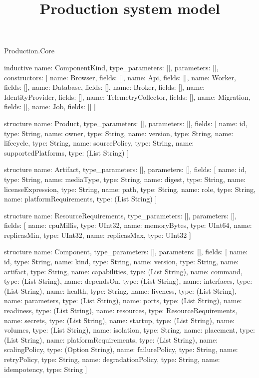 \begin{lexlean}{Production.Core}
\title{Production system model}
\begin{semanticmodule}
inductive{
  name: ComponentKind,
  type_parameters: [],
  parameters: [],
  constructors: [
    {name: Browser, fields: []},
    {name: Api, fields: []},
    {name: Worker, fields: []},
    {name: Database, fields: []},
    {name: Broker, fields: []},
    {name: IdentityProvider, fields: []},
    {name: TelemetryCollector, fields: []},
    {name: Migration, fields: []},
    {name: Job, fields: []}
  ]
}

structure{
  name: Product,
  type_parameters: [],
  parameters: [],
  fields: [
    {name: id, type: String},
    {name: owner, type: String},
    {name: version, type: String},
    {name: lifecycle, type: String},
    {name: sourcePolicy, type: String},
    {name: supportedPlatforms, type: (List String)}
  ]
}

structure{
  name: Artifact,
  type_parameters: [],
  parameters: [],
  fields: [
    {name: id, type: String},
    {name: mediaType, type: String},
    {name: digest, type: String},
    {name: licenseExpression, type: String},
    {name: path, type: String},
    {name: role, type: String},
    {name: platformRequirements, type: (List String)}
  ]
}

structure{
  name: ResourceRequirements,
  type_parameters: [],
  parameters: [],
  fields: [
    {name: cpuMillis, type: UInt32},
    {name: memoryBytes, type: UInt64},
    {name: replicasMin, type: UInt32},
    {name: replicasMax, type: UInt32}
  ]
}

structure{
  name: Component,
  type_parameters: [],
  parameters: [],
  fields: [
    {name: id, type: String},
    {name: kind, type: String},
    {name: version, type: String},
    {name: artifact, type: String},
    {name: capabilities, type: (List String)},
    {name: command, type: (List String)},
    {name: dependsOn, type: (List String)},
    {name: interfaces, type: (List String)},
    {name: health, type: String},
    {name: liveness, type: (List String)},
    {name: parameters, type: (List String)},
    {name: ports, type: (List String)},
    {name: readiness, type: (List String)},
    {name: resources, type: ResourceRequirements},
    {name: secrets, type: (List String)},
    {name: startup, type: (List String)},
    {name: volumes, type: (List String)},
    {name: isolation, type: String},
    {name: placement, type: (List String)},
    {name: platformRequirements, type: (List String)},
    {name: scalingPolicy, type: (Option String)},
    {name: failurePolicy, type: String},
    {name: retryPolicy, type: String},
    {name: degradationPolicy, type: String},
    {name: idempotency, type: String}
  ]
}


\end{semanticmodule}
\end{lexlean}
